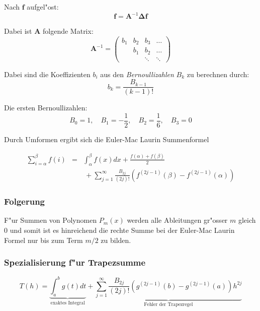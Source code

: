 \documentclass[german, 10pt, a4paper, twocolumn]{scrartcl}
\theoremstyle{definition}
\begin{document}
Nach $\mathbf{f}$ aufgel"ost:
\begin{displaymath}
	\mathbf{f} = \mathbf{A}^{-1}\mathbf{\Delta f}
\end{displaymath}

Dabei ist $\mathbf{A}$ folgende Matrix:
\begin{displaymath}
	\mathbf{A}^{-1} = \left (
	\begin{array}{cccc}
		b_1 &	b_2 &	b_3 &	\hdots\\
		&	b_1 &	b_2 &	\hdots\\
		&	&	\ddots &\ddots
	\end{array}
	\right )
\end{displaymath}

Dabei sind die Koeffizienten $b_i$ aus den \textit{Bernoullizahlen} $B_k$ zu berechnen durch:
\begin{displaymath}
	b_k = \frac{B_{k-1}}{(k-1)!}
\end{displaymath}

Die ersten Bernoullizahlen:
\begin{displaymath}
	B_0 = 1, \quad B_1 = -\frac{1}{2}, \quad B_2 = \frac{1}{6}, \quad B_3 = 0
\end{displaymath}

Durch Umformen ergibt sich die Euler-Mac Laurin Summenformel

\begin{eqnarray*}
	\sum^\beta_{i=\alpha} f(i) &	= &	\int^\beta_\alpha f(x)dx + \frac{f(\alpha) + f(\beta)}{2}\\
	&				&	\ + \sum^\infty_{j=1} \frac{B_{2j}}{(2j)!} (f^{(2j-1)}(\beta) - f^{(2j-1)}(\alpha))
\end{eqnarray*}


\subsubsection{Folgerung}

F"ur Summen von Polynomen $P_m(x)$ werden alle Ableitungen gr"osser $m$ gleich 0 und somit ist es hinreichend die rechte Summe bei der Euler-Mac Laurin Formel nur bis zum Term $m/2$ zu bilden.

\subsubsection{Spezialisierung f"ur Trapezsumme}

\small
\begin{displaymath}
	T(h) = \underbrace{\int^b_a g(t) dt}_{\mbox{exaktes Integral}} + \underbrace{\sum^\infty_{j=1} \frac{B_{2j}}{(2j)!}(g^{(2j-1)}(b) - g^{(2j-1)}(a))h^{2j}}_{\mbox{Fehler der Trapezregel}}
\end{displaymath}
\normalsize
\end{document}
